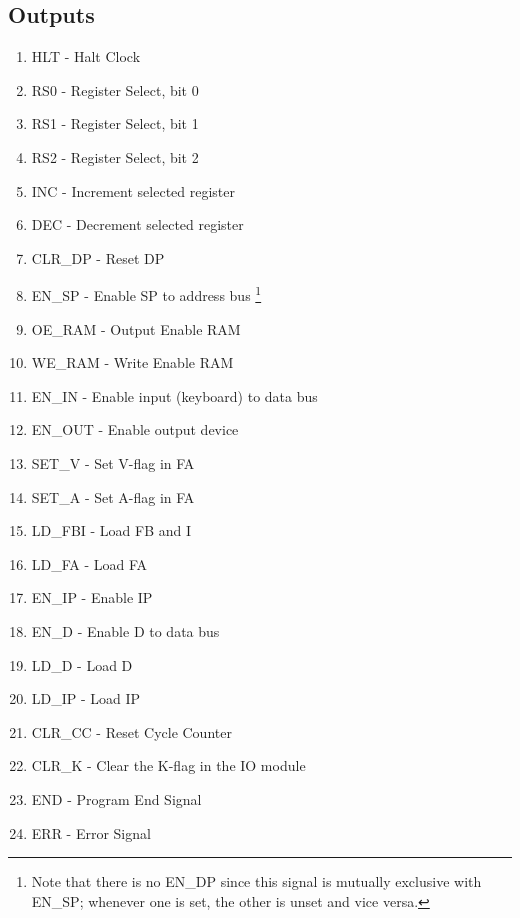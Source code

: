 \subsection*{Outputs}
\begin{enumerate}
\itemsep0em 
\item HLT - Halt Clock
\item RS0 - Register Select, bit 0
\item RS1 - Register Select, bit 1
\item RS2 - Register Select, bit 2
\item INC - Increment selected register
\item DEC - Decrement selected register
\item CLR\_DP - Reset DP
\item EN\_SP - Enable SP to address bus \footnote{Note that there is no EN\_DP since this signal is mutually exclusive with EN\_SP; whenever one is set, the other is unset and vice versa.}
\item OE\_RAM - Output Enable RAM
\item WE\_RAM - Write Enable RAM
\item EN\_IN - Enable input (keyboard) to data bus
\item EN\_OUT - Enable output device
\item SET\_V - Set V-flag in FA
\item SET\_A - Set A-flag in FA
\item LD\_FBI - Load FB and I
\item LD\_FA - Load FA
\item EN\_IP - Enable IP
\item EN\_D - Enable D to data bus
\item LD\_D - Load D
\item LD\_IP - Load IP
\item CLR\_CC - Reset Cycle Counter
\item CLR\_K - Clear the K-flag in the IO module
\item END - Program End Signal
\item ERR - Error Signal
\end{enumerate}
